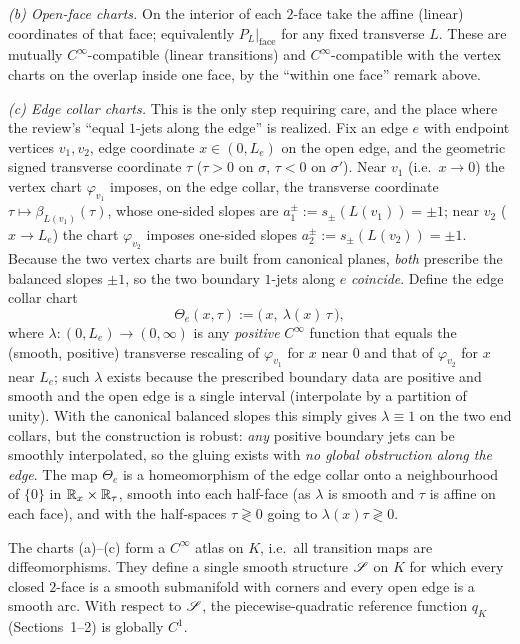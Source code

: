 \emph{(b) Open-face charts.} On the interior of each $2$-face take the affine
(linear) coordinates of that face; equivalently $P_L|_{\text{face}}$ for any fixed
transverse $L$. These are mutually $C^\infty$-compatible (linear transitions) and
$C^\infty$-compatible with the vertex charts on the overlap inside one face, by the
``within one face'' remark above.

\emph{(c) Edge collar charts.} This is the only step requiring care, and the place
where the review's ``equal $1$-jets along the edge'' is realized. Fix an edge $e$
with endpoint vertices $v_1,v_2$, edge coordinate $x\in(0,L_e)$ on the open edge,
and the geometric signed transverse coordinate $\tau$ ($\tau>0$ on $\sigma$,
$\tau<0$ on $\sigma'$). Near $v_1$ (i.e.\ $x\to0$) the vertex chart $\varphi_{v_1}$
imposes, on the edge collar, the transverse coordinate
$\tau\mapsto\beta_{L(v_1)}(\tau)$, whose one-sided slopes are
$a_1^\pm:=s_\pm(L(v_1))=\pm1$; near $v_2$ ($x\to L_e$) the chart $\varphi_{v_2}$
imposes one-sided slopes $a_2^\pm:=s_\pm(L(v_2))=\pm1$. Because the two vertex
charts are built from canonical planes, \emph{both} prescribe the balanced slopes
$\pm1$, so the two boundary $1$-jets along $e$ \emph{coincide}. Define the edge
collar chart
\[
\Theta_e(x,\tau):=\bigl(\,x,\ \lambda(x)\,\tau\,\bigr),
\]
where $\lambda\colon(0,L_e)\to(0,\infty)$ is any \emph{positive} $C^\infty$ function
that equals the (smooth, positive) transverse rescaling of $\varphi_{v_1}$ for $x$
near $0$ and that of $\varphi_{v_2}$ for $x$ near $L_e$; such $\lambda$ exists
because the prescribed boundary data are positive and smooth and the open edge is a
single interval (interpolate by a partition of unity). With the canonical balanced
slopes this simply gives $\lambda\equiv1$ on the two end collars, but the
construction is robust: \emph{any} positive boundary jets can be smoothly
interpolated, so the gluing exists with \emph{no global obstruction along the
edge}. The map $\Theta_e$ is a homeomorphism of the edge collar onto a neighbourhood
of $\{0\}$ in $\mathbb{R}_x\times\mathbb{R}_\tau$, smooth into each half-face (as $\lambda$ is
smooth and $\tau$ is affine on each face), and with the half-spaces $\tau\gtrless0$
going to $\lambda(x)\tau\gtrless0$.

\begin{qeightproposition}\label{prop:smooth-structure}
The charts \textup{(a)--(c)} form a $C^\infty$ atlas on $K$, i.e.\ all transition
maps are diffeomorphisms. They define a single smooth structure $\mathscr S$ on $K$ for
which every closed $2$-face is a smooth submanifold with corners and every open
edge is a smooth arc. With respect to $\mathscr S$, the piecewise-quadratic reference
function $q_K$ (Sections~1--2) is globally $C^1$.
\end{qeightproposition}

